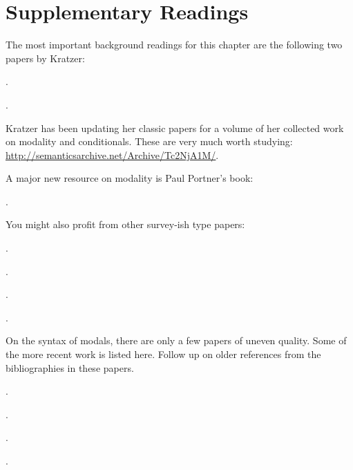 \newpage\section{Supplementary Readings} \label{sec:suppl-read-modals}{\setlength{\parindent}{0pt}\setlength{\parskip}{6pt}

The most important background readings for this chapter are the following two papers by Kratzer:

\begin{bibentrylist}
	\item {}.
	\item {}.
\end{bibentrylist}

Kratzer has been updating her classic papers for a volume of her collected work on modality and conditionals. These are very much worth studying: \url{http://semanticsarchive.net/Archive/Tc2NjA1M/}.

A major new resource on modality is Paul Portner's book:

\begin{bibentrylist}
  \item{}.
\end{bibentrylist}

You might also profit from other survey-ish type papers:

\begin{bibentrylist}
  \item {}.
  \item {}.
  \item {}.
  \item {}.
\end{bibentrylist}

On the syntax of modals, there are only a few papers of uneven quality. Some of the more recent work is listed here. Follow up on older references from the bibliographies in these papers.

\begin{bibentrylist}
	\item {}. 
	\item {}. 
	\item {}. 
	\item {}. 
\end{bibentrylist}

}
